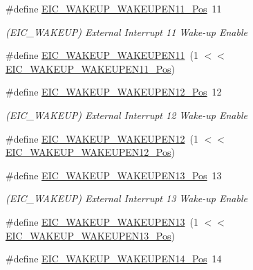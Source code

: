 \begin{DoxyCompactItemize}
\item 
\#define \mbox{\hyperlink{group___s_a_m_d21___e_i_c_gaaad54cabab507c08b4a8e13a145b77c7}{E\+I\+C\+\_\+\+W\+A\+K\+E\+U\+P\+\_\+\+W\+A\+K\+E\+U\+P\+E\+N11\+\_\+\+Pos}}~11
\begin{DoxyCompactList}\small\item\em (E\+I\+C\+\_\+\+W\+A\+K\+E\+UP) External Interrupt 11 Wake-\/up Enable \end{DoxyCompactList}\item 
\#define \mbox{\hyperlink{group___s_a_m_d21___e_i_c_ga6738597ca18d1c1938942f84a9ba7e89}{E\+I\+C\+\_\+\+W\+A\+K\+E\+U\+P\+\_\+\+W\+A\+K\+E\+U\+P\+E\+N11}}~(1 $<$$<$ \mbox{\hyperlink{group___s_a_m_d21___e_i_c_gaaad54cabab507c08b4a8e13a145b77c7}{E\+I\+C\+\_\+\+W\+A\+K\+E\+U\+P\+\_\+\+W\+A\+K\+E\+U\+P\+E\+N11\+\_\+\+Pos}})
\item 
\#define \mbox{\hyperlink{group___s_a_m_d21___e_i_c_ga41c5deb6e5f0ccd8cd276e87c6cf9d35}{E\+I\+C\+\_\+\+W\+A\+K\+E\+U\+P\+\_\+\+W\+A\+K\+E\+U\+P\+E\+N12\+\_\+\+Pos}}~12
\begin{DoxyCompactList}\small\item\em (E\+I\+C\+\_\+\+W\+A\+K\+E\+UP) External Interrupt 12 Wake-\/up Enable \end{DoxyCompactList}\item 
\#define \mbox{\hyperlink{group___s_a_m_d21___e_i_c_gaea9822ac470fc5ad3ceeff45c3698730}{E\+I\+C\+\_\+\+W\+A\+K\+E\+U\+P\+\_\+\+W\+A\+K\+E\+U\+P\+E\+N12}}~(1 $<$$<$ \mbox{\hyperlink{group___s_a_m_d21___e_i_c_ga41c5deb6e5f0ccd8cd276e87c6cf9d35}{E\+I\+C\+\_\+\+W\+A\+K\+E\+U\+P\+\_\+\+W\+A\+K\+E\+U\+P\+E\+N12\+\_\+\+Pos}})
\item 
\#define \mbox{\hyperlink{group___s_a_m_d21___e_i_c_ga9fb79fab8777d68ff3fbdc6150c56689}{E\+I\+C\+\_\+\+W\+A\+K\+E\+U\+P\+\_\+\+W\+A\+K\+E\+U\+P\+E\+N13\+\_\+\+Pos}}~13
\begin{DoxyCompactList}\small\item\em (E\+I\+C\+\_\+\+W\+A\+K\+E\+UP) External Interrupt 13 Wake-\/up Enable \end{DoxyCompactList}\item 
\#define \mbox{\hyperlink{group___s_a_m_d21___e_i_c_ga2f806e0d78bb3e00e5fefdadc6d3eb0d}{E\+I\+C\+\_\+\+W\+A\+K\+E\+U\+P\+\_\+\+W\+A\+K\+E\+U\+P\+E\+N13}}~(1 $<$$<$ \mbox{\hyperlink{group___s_a_m_d21___e_i_c_ga9fb79fab8777d68ff3fbdc6150c56689}{E\+I\+C\+\_\+\+W\+A\+K\+E\+U\+P\+\_\+\+W\+A\+K\+E\+U\+P\+E\+N13\+\_\+\+Pos}})
\item 
\#define \mbox{\hyperlink{group___s_a_m_d21___e_i_c_ga37d15df8b1587e2efb5efa57a7bbc7bb}{E\+I\+C\+\_\+\+W\+A\+K\+E\+U\+P\+\_\+\+W\+A\+K\+E\+U\+P\+E\+N14\+\_\+\+Pos}}~14
$$
\end{DoxyCompactItemize}
